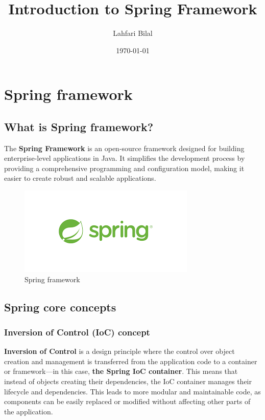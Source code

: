 \documentclass{article}
\title{Introduction to Spring Framework}
\author{Lahfari Bilal}
\date{\today}
\begin{document}
\maketitle

\section{Spring framework}
\subsection{What is Spring framework?}

The \textbf{Spring Framework} is an open-source framework designed for building enterprise-level applications in Java. It simplifies the development process by providing a comprehensive programming and configuration model, making it easier to create robust and scalable applications.

\begin{figure}[H]
    \centering
    \begin{framed}
        \includegraphics[width=0.8\linewidth]{images/spring_logo.png}
    \end{framed}
    \caption{Spring framework}
    \label{fig:spring-logo}
\end{figure}

\subsection{Spring core concepts}

\subsubsection{Inversion of Control (IoC) concept}

\textbf{Inversion of Control} is a design principle where the control over object creation and management is transferred from the application code to a container or framework—in this case, \textbf{the Spring IoC container}. This means that instead of objects creating their dependencies, the IoC container manages their lifecycle and dependencies. This leads to more modular and maintainable code, as components can be easily replaced or modified without affecting other parts of the application.
\end{document}
